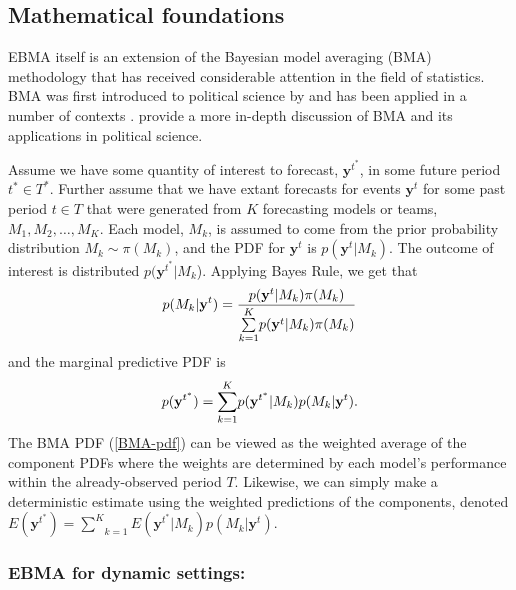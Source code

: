 \documentclass[12pt,fullpage,endnotes]{article}
\begin{document}
\subsection{Mathematical foundations}

EBMA itself is an extension of the Bayesian model averaging (BMA)
methodology \citep[c.f.,][]{Madigan:1994, Draper:1995, Raftery:1995,
  Hoeting:1999, Clyde:2003, Raftery:2003, Clyde:2004} that has
received considerable attention in the field of statistics. BMA was
first introduced to political science by \citet{Bartels:1997} and has
been applied in a number of contexts \citep[e.g.,][]{Bartels:2001,
  Gill:2004, Imai:2004,
  Geer:2006b}. 
provide a more in-depth discussion of BMA and its applications in
political science.


Assume we have some quantity of interest to forecast,
$\mathbf{y}^{t^*}$, in some future period $t^\ast \in
T^\ast$.  Further assume that we have extant forecasts for events
$\mathbf{y}^t$ for some past period $t \in T$ that were generated from
$K$ forecasting models or teams, $M_1, M_2, \ldots, M_K$. Each model,
$M_k$, is assumed to come from the prior probability distribution
$M_k\sim \pi(M_k)$, and the PDF for $\mathbf{y}^t$ is
$p(\mathbf{y}^t|M_k)$. The outcome of interest is distributed
$p(\mathbf{y}^{t^*}|M_k$).  Applying Bayes Rule, we get that
\begin{equation} \small
p(M_k|\mathbf{y}^t) = \frac{p(\mathbf{y}^t|M_k)\pi(M_k)}{\underset{k=1}{\overset{K}{\sum}}p(\mathbf{y}^t|M_k)\pi(M_k)}
\end{equation}
\noindent and the marginal predictive PDF is
\begin{equation}
\label{BMA-pdf}
\small
p(\mathbf{y}^{t^*}) = \underset{k=1}{\overset{K}{\sum}} p(\mathbf{y}^{t^*}|M_k)p(M_k|\mathbf{y}^{t}).
\end{equation}
The BMA PDF (\ref{BMA-pdf}) can be viewed as the weighted average of
the component PDFs where the weights are determined by each model's
performance within the already-observed period $T$.  Likewise, we can
simply make a deterministic estimate using the weighted predictions of
the components, denoted
$E(\mathbf{y}^{t^*}) = \underset{k=1}{\overset{K}{\sum}}
E(\mathbf{y}^{t^*}|M_k)p(M_k|\mathbf{y}^{t})$. 

\subsubsection{EBMA for dynamic settings: }
\end{document}
